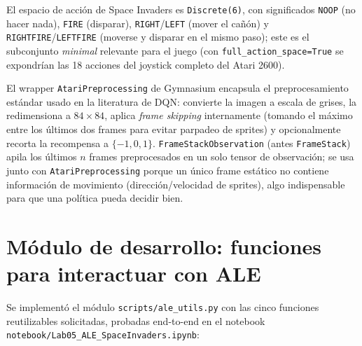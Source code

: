 \documentclass[11pt]{article}
\begin{document}
El espacio de acci\'on de Space Invaders es \texttt{Discrete(6)}, con significados
\texttt{NOOP} (no hacer nada), \texttt{FIRE} (disparar), \texttt{RIGHT}/\texttt{LEFT} (mover el
ca\~n\'on) y \texttt{RIGHTFIRE}/\texttt{LEFTFIRE} (moverse y disparar en el mismo paso); este es el
subconjunto \textit{minimal} relevante para el juego (con \texttt{full\_action\_space=True} se
expondr\'ian las 18 acciones del joystick completo del Atari 2600).

El wrapper \texttt{AtariPreprocessing} de Gymnasium encapsula el preprocesamiento est\'andar usado
en la literatura de DQN: convierte la imagen a escala de grises, la redimensiona a $84\times84$,
aplica \textit{frame skipping} internamente (tomando el m\'aximo entre los \'ultimos dos frames
para evitar parpadeo de sprites) y opcionalmente recorta la recompensa a $\{-1,0,1\}$.
\texttt{FrameStackObservation} (antes \texttt{FrameStack}) apila los \'ultimos $n$ frames
preprocesados en un solo tensor de observaci\'on; se usa junto con \texttt{AtariPreprocessing}
porque un \'unico frame est\'atico no contiene informaci\'on de movimiento (direcci\'on/velocidad
de sprites), algo indispensable para que una pol\'itica pueda decidir bien.

\section{M\'odulo de desarrollo: funciones para interactuar con ALE}

Se implement\'o el m\'odulo \texttt{scripts/ale\_utils.py} con las cinco funciones reutilizables
solicitadas, probadas end-to-end en el notebook \texttt{notebook/Lab05\_ALE\_SpaceInvaders.ipynb}:
\end{document}
